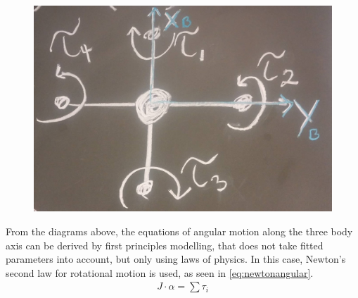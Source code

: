 \begin{minipage}{\linewidth}
\begin{minipage}{0.45\linewidth}
\begin{figure}[H]
			\label{fig:diagramQuad}
		\end{figure}
	\end{minipage}
	\hspace{0.03\linewidth}
	\begin{minipage}{0.45\linewidth}
		\begin{figure}[H] \vspace{16mm}
			\includegraphics[scale=.18]{figures/torques_diagram}
			\centering
			\label{fig:diagramTorque}
		\end{figure}
	\end{minipage}
\end{minipage}

From the diagrams above, the equations of angular motion along the three body axis can be derived by first principles modelling, that does not take fitted parameters into account, but only using laws of physics. In this case, Newton's second law for rotational motion is used, as seen in \autoref{eq:newtonangular}.
\begin{align}
	J\cdot\alpha=\sum\tau_i
	\label{eq:newtonangular}
\end{align}
\begin{where}
\end{where}

